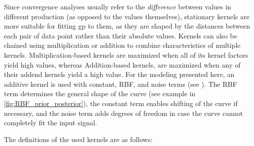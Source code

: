 Since convergence analyses usually refer to the \textit{difference} between values in different production (as opposed to the values themselves), stationary kernels are more suitable for fitting \ac{gp} to them, as they are shaped by the distances between each pair of data point rather than their absolute values.
Kernels can also be chained using multiplication or addition to combine characteristics of multiple kernels.
Multiplication-based kernels are maximized when all of its kernel factors yield high values, whereas
Addition-based kernels, are maximized when any of their addend kernels yield a high value.
For the modeling presented here, an additive kernel is used with constant, RBF, and noise terms (see ).
The RBF term determines the general shape of the curve (see example in \cref{fig:RBF_prior_posterior}), the constant term enables shifting of the curve if necessary, and the noise term adds degrees of freedom in case the curve cannot completely fit the input signal.

The definitions of the used kernels are as follows:

